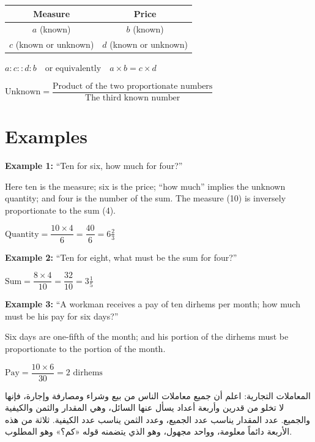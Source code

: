 \documentclass[11pt,a4paper,openany,oneside]{book}
\begin{document}
\begin{mathbox}[title={\textbf{The Rule of Four Numbers}}]
\begin{center}
\begin{tabular}{c|c}
\textbf{Measure} & \textbf{Price} \\
\hline
$a$ (known) & $b$ (known) \\
$c$ (known or unknown) & $d$ (known or unknown) \\
\end{tabular}

\vspace{0.3cm}

$a : c :: d : b \quad\text{or equivalently}\quad a \times b = c \times d$

$\text{Unknown} = \dfrac{\text{Product of the two proportionate numbers}}{\text{The third known number}}$
\end{center}
\end{mathbox}

\section*{Examples}

\textbf{Example 1:} ``Ten for six, how much for four?''

Here ten is the measure; six is the price; ``how much'' implies the unknown
quantity; and four is the number of the sum. The measure (10) is inversely
proportionate to the sum (4).

$\text{Quantity} = \dfrac{10 \times 4}{6} = \dfrac{40}{6} = 6\tfrac{2}{3}$

\textbf{Example 2:} ``Ten for eight, what must be the sum for four?''

$\text{Sum} = \dfrac{8 \times 4}{10} = \dfrac{32}{10} = 3\tfrac{1}{5}$

\textbf{Example 3:} ``A workman receives a pay of ten dirhems per month;
how much must be his pay for six days?''

Six days are one-fifth of the month; and his portion of the dirhems must be
proportionate to the portion of the month.

$\text{Pay} = \dfrac{10 \times 6}{30} = 2 \text{ dirhems}$

\begin{arabicbox}
\begin{Arabic}
المعاملات التجارية: اعلم أن جميع معاملات الناس من بيع وشراء
ومصارفة وإجارة، فإنها لا تخلو من قدرين وأربعة أعداد يسأل
عنها السائل، وهي المقدار والثمن والكيفية والجميع. عدد المقدار
يناسب عدد الجميع، وعدد الثمن يناسب عدد الكيفية. ثلاثة من هذه
الأربعة دائماً معلومة، وواحد مجهول، وهو الذي يتضمنه قوله «كم؟»
وهو المطلوب.
\end{Arabic}
\end{arabicbox}
\end{document}

